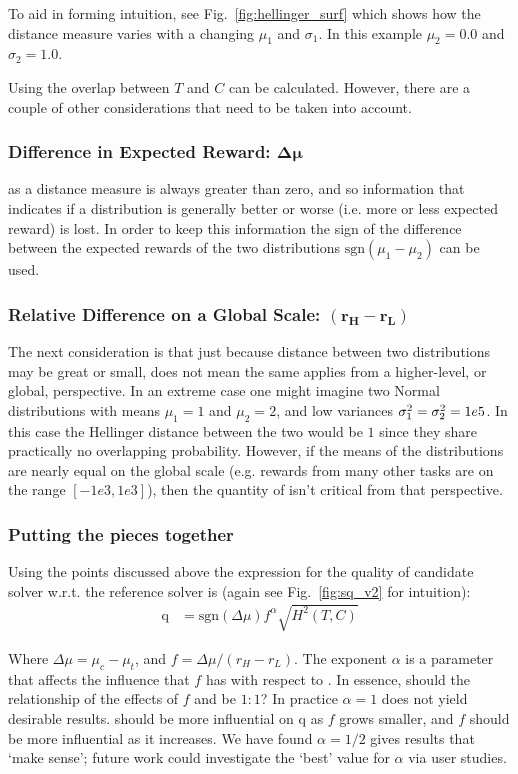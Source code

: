 To aid in forming intuition, see Fig.~\ref{fig:hellinger_surf} which shows how the distance measure varies with a changing $\mu_1$ and $\sigma_1$. In this example $\mu_2=0.0$ and $\sigma_2=1.0$.

Using \hell{} the overlap between $T$ and $C$ can be calculated. However, there are a couple of other considerations that need to be taken into account. 

\subsubsection{Difference in Expected Reward: $\bm{\Delta \mu}$}
\hell{} as a distance measure is always greater than zero, and so information that indicates if a distribution is generally better or worse (i.e. more or less expected reward) is lost. In order to keep this information the sign of the difference between the expected rewards of the two distributions $\text{sgn}(\mu_1-\mu_2)$ can be used.

\subsubsection{Relative Difference on a Global Scale: $\bm{(r_H-r_L)}$}
The next consideration is that just because distance between two distributions may be great or small, does not mean the same applies from a higher-level, or global, perspective. In an extreme case one might imagine two Normal distributions with means $\mu_1=1$ and $\mu_2=2$, and low variances $\sigma_1^2=\sigma_2^2=1e\-5$. In this case the Hellinger distance between the two would be $1$ since they share practically no overlapping probability. However, if the means of the distributions are nearly equal on the global scale (e.g. rewards from many other tasks are on the range $[-1e3,1e3]$), then the quantity of \hell{} isn't critical from that perspective.

\subsubsection{Putting the pieces together}
Using the points discussed above the expression for the quality of candidate solver \solve{} w.r.t. the reference solver \solvestar{} is (again see Fig.~\ref{fig:sq_v2} for intuition):
\begin{align}
    \text{q} &= \text{sgn}(\Delta \mu)f^{\alpha}\sqrt{H^{2}(T,C)} \label{eq:q}
\end{align}

Where $\Delta \mu = \mu_c-\mu_t$, and $f = \Delta \mu/(r_H-r_L)$. The exponent $\alpha$ is a parameter that affects the influence that $f$ has with respect to \hell. In essence, should the relationship of the effects of $f$ and \hell{} be $1:1$? In practice $\alpha=1$ does not yield desirable results. \hell{} should be more influential on $\text{q}$ as $f$ grows smaller, and $f$ should be more influential as it increases. We have found $\alpha=1/2$ gives results that `make sense'; future work could investigate the `best' value for $\alpha$ via user studies.

